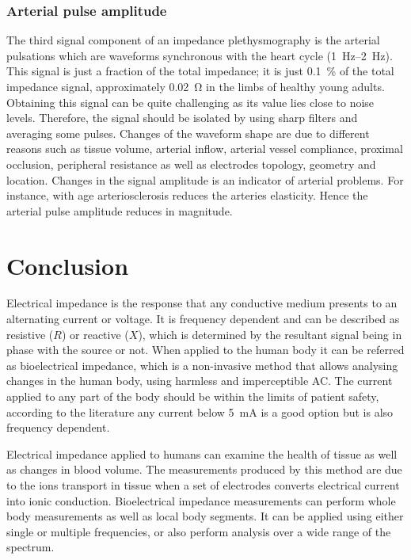 \subsubsection{Arterial pulse amplitude}
The third signal component of an impedance plethysmography is the arterial pulsations which are waveforms synchronous with the heart cycle (\SIrange{1}{2}{\hertz}). This signal is just a fraction of the total impedance; it is just \SI{0.1}{\percent} of the total impedance signal, approximately \SI{0.02}{\ohm} in the limbs of healthy young adults. Obtaining this signal can be quite challenging as its value lies close to noise levels. Therefore, the signal should be isolated by using sharp filters and averaging some pulses. Changes of the waveform shape are due to different reasons such as tissue volume, arterial inflow, arterial vessel compliance, proximal occlusion, peripheral resistance as well as electrodes topology, geometry and location.  Changes in the signal amplitude is an indicator of arterial problems. For instance, with age arteriosclerosis reduces the arteries elasticity. Hence the arterial pulse amplitude reduces in magnitude.

\section{Conclusion}
Electrical impedance is the response that any conductive medium presents to an alternating current or voltage. It is frequency dependent and can be described as resistive ($R$) or reactive ($X$), which is determined by the resultant signal being in phase with the source or not. When applied to the human body it can be referred as bioelectrical impedance, which is a non-invasive method that allows analysing changes in the human body, using harmless and imperceptible AC. The current applied to any part of the body should be within the limits of patient safety, according to the literature any current below \SI{5}{\mA} is a good option but is also frequency dependent. 

Electrical impedance applied to humans can examine the health of tissue as well as changes in blood volume. The measurements produced by this method are due to the ions transport in tissue when a set of electrodes converts electrical current into ionic conduction. Bioelectrical impedance measurements can perform whole body measurements as well as local body segments. It can be applied using either single or multiple frequencies, or also perform analysis over a wide range of the spectrum. 

